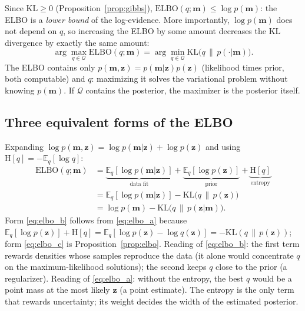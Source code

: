 \documentclass[11pt,a4paper]{article}
\numberwithin{equation}{section}
\theoremstyle{plain}
\theoremstyle{definition}
\theoremstyle{remark}
\newcommand{\m}{\mathbf{m}}
\newcommand{\z}{\mathbf{z}}
\newcommand{\E}{\mathbb{E}}
\newcommand{\KL}{\mathrm{KL}}
\newcommand{\Hent}{\mathrm{H}}
\newcommand{\ELBO}{\mathrm{ELBO}}
\begin{document}
Since $\KL\ge0$ (Proposition~\ref{prop:gibbs}), $\ELBO(q;\m)\le\log p(\m)$: the ELBO is a \emph{lower bound} of the log-evidence. More importantly, $\log p(\m)$ does not depend on $q$, so increasing the ELBO by some amount decreases the KL divergence by exactly the same amount:
\begin{equation}
\boxed{\ \arg\max_{q\in\mathcal Q}\ELBO(q;\m)=\arg\min_{q\in\mathcal Q}\KL\big(q\,\|\,p(\cdot|\m)\big).\ }
\end{equation}
The ELBO contains only $p(\m,\z)=p(\m|\z)p(\z)$ (likelihood times prior, both computable) and $q$: maximizing it solves the variational problem without knowing $p(\m)$. If $\mathcal Q$ contains the posterior, the maximizer is the posterior itself.

\subsection{Three equivalent forms of the ELBO}
Expanding $\log p(\m,\z)=\log p(\m|\z)+\log p(\z)$ and using $\Hent[q]=-\E_q[\log q]$:
\begin{align}
\ELBO(q;\m)&=\underbrace{\E_q[\log p(\m|\z)]}_{\text{data fit}}+\underbrace{\E_q[\log p(\z)]}_{\text{prior}}+\underbrace{\Hent[q]}_{\text{entropy}}
\label{eq:elbo_a}\\
&=\E_q[\log p(\m|\z)]-\KL\big(q\,\|\,p(\z)\big)
\label{eq:elbo_b}\\
&=\log p(\m)-\KL\big(q\,\|\,p(\z|\m)\big).
\label{eq:elbo_c}
\end{align}
Form \eqref{eq:elbo_b} follows from \eqref{eq:elbo_a} because $\E_q[\log p(\z)]+\Hent[q]=\E_q[\log p(\z)-\log q(\z)]=-\KL(q\,\|\,p(\z))$; form \eqref{eq:elbo_c} is Proposition~\ref{prop:elbo}.
Reading of \eqref{eq:elbo_b}: the first term rewards densities whose samples reproduce the data (it alone would concentrate $q$ on the maximum-likelihood solutions); the second keeps $q$ close to the prior (a regularizer). Reading of \eqref{eq:elbo_a}: without the entropy, the best $q$ would be a point mass at the most likely $\z$ (a point estimate). The entropy is the only term that rewards uncertainty; its weight decides the width of the estimated posterior.
\end{document}

